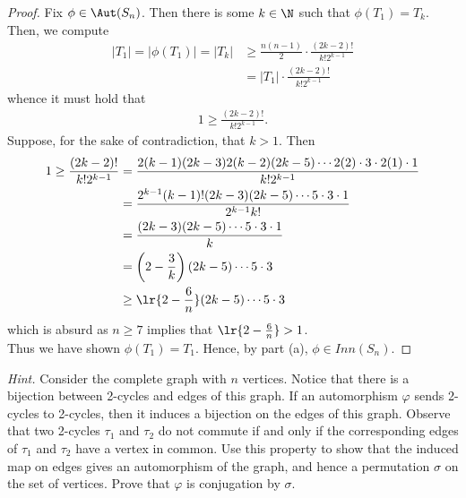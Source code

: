 \documentclass[12pt]{article}
\begin{document}
\begin{homeworkProblem}
  \begin{proof}
    Fix $ \phi\in \Aut(S_{n}) $. Then there is some $ k\in \N $ such that $ \phi(T_{1}) = T_{k} $. Then, we compute
    \begin{align*}
      |T_{1}| = | \phi(T_{1})| = |T_{k}| &\geq \frac{n(n-1)}{2} \cdot \frac{(2k-2)!}{k! 2^{k-1}}\\
      &= |T_{1}| \cdot\frac{(2k-2)!}{k! 2^{k-1}}
    \end{align*}
    whence it must hold that
    \begin{align*}
      1 \geq \frac{(2k-2)!}{k! 2^{k-1}}.
    \end{align*}
    Suppose, for the sake of contradiction, that $ k>1 $. Then 
    \begin{align*}
      1 \geq \frac{(2k-2)!}{k! 2^{k-1}} &= \frac{2(k-1)(2k-3)2(k-2)(2k-5)\cdots2(2)\cdot 3\cdot 2(1) \cdot 1}{k!2^{k-1}}\\
      &=\frac{2^{k-1}(k-1)! (2k-3)(2k-5)\cdots5\cdot3\cdot1}{2^{k-1}k!} \\
      &=\frac{(2k-3)(2k-5)\cdots5\cdot3\cdot1}{k} \\
      &=\left(2-\frac{3}{k}\right)(2k-5)\cdots5\cdot3 \\
      &\geq\lr{2-\frac{6}{n}}(2k-5)\cdots5\cdot3 \\
    \end{align*}
    which is absurd as $ n\geq 7 $ implies that $ \lr{2-\frac{6}{n}} >1 $. \\

    Thus we have shown $ \phi(T_{1}) = T_{1} $. Hence, by part (a), $ \phi\in Inn(S_{n}) $.
  \end{proof}

  \textit{Hint.} Consider the complete graph with $n$ vertices. Notice that there is a bijection between 2-cycles and edges of this graph.  
  If an automorphism $\varphi$ sends 2-cycles to 2-cycles, then it induces a bijection on the edges of this graph.  
  Observe that two 2-cycles $\tau_1$ and $\tau_2$ do not commute if and only if the corresponding edges of $\tau_1$ and $\tau_2$ have a vertex in common.  
  Use this property to show that the induced map on edges gives an automorphism of the graph, and hence a permutation $\sigma$ on the set of vertices.  
  Prove that $\varphi$ is conjugation by $\sigma$.
\end{homeworkProblem}
\end{document}
